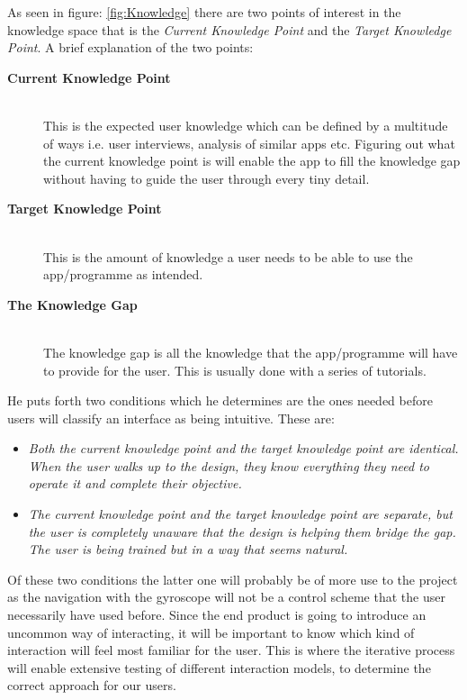 As seen in figure: \ref{fig:Knowledge} there are two points of interest in the 
knowledge space that is the \textit{Current Knowledge Point} and the 
\textit{Target Knowledge Point}. A brief explanation of the two points:
\begin{description}
 \item[\textbf{Current Knowledge Point}] \hfill\\
This is the expected user knowledge which can be defined by a multitude of ways i.e. user interviews, analysis of similar apps etc. Figuring out what the 
current knowledge point is will enable the app to fill the knowledge gap without 
having to guide the user through every tiny detail. 
\item[\textbf{Target Knowledge Point}]\hfill\\
This is the amount of knowledge a user needs to be able to use the app/programme
as intended.
\item[\textbf{The Knowledge Gap}]\hfill\\
The knowledge gap is all the knowledge that the app/programme will have to 
provide for the user. This is usually done with a series of tutorials. 
\end{description}

He puts forth two conditions which he determines are the ones needed 
before users will classify an interface as being intuitive. These are:
\begin{itemize}
\item \textit{Both the current knowledge point and the target knowledge point are 
identical. When the user walks up to the design, they know everything they need 
to operate it and complete their objective.}
\item \textit{The current knowledge point and the target knowledge point are 
separate, but the user is completely unaware that the design is helping them bridge 
the gap. The user is being trained but in a way that seems natural.}
\end{itemize}\label{intuitiveConditions} 
Of these two conditions the latter one will probably be of more use to the 
project as the navigation with the gyroscope will not be a control scheme that 
the user necessarily  have used before. Since the end product is going to 
introduce an uncommon way of interacting, it will be important to know which kind 
of interaction will feel most familiar for the user. This is where the iterative 
process will enable extensive testing of different interaction models, to 
determine the correct approach for our users.
